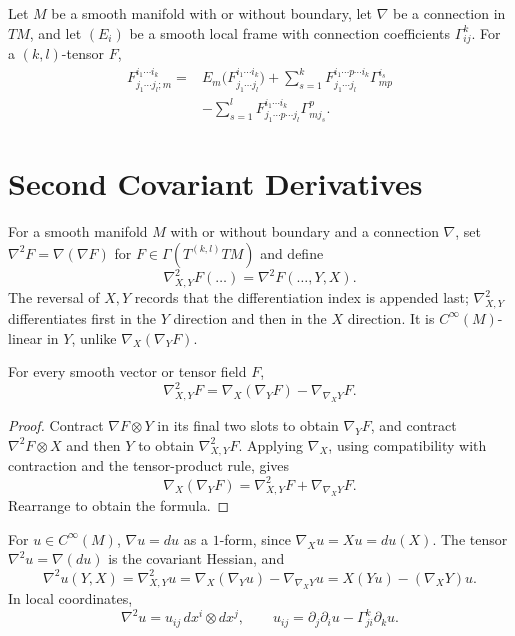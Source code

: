 \begin{proposition}
\label{prop:total-covariant-derivative-components}
Let $M$ be a smooth manifold with or without boundary, let $\nabla$ be a
connection in $TM$, and let $(E_i)$ be a smooth local frame with connection
coefficients $\Gamma^k_{ij}$. For a $(k,l)$-tensor $F$,
\[
\begin{aligned}
F^{i_1\cdots i_k}_{j_1\cdots j_l;m}
={}&E_m\bigl(F^{i_1\cdots i_k}_{j_1\cdots j_l}\bigr)
+\sum_{s=1}^kF^{i_1\cdots p\cdots i_k}_{j_1\cdots j_l}\Gamma^{i_s}_{mp}\\
&-\sum_{s=1}^lF^{i_1\cdots i_k}_{j_1\cdots p\cdots j_l}\Gamma^p_{mj_s}.
\end{aligned}
\]
\end{proposition}

\section{Second Covariant Derivatives}

For a smooth manifold $M$ with or without boundary and a connection $\nabla$,
set $\nabla^2F=\nabla(\nabla F)$ for $F\in\Gamma(T^{(k,l)}TM)$ and define
\[
\nabla^2_{X,Y}F(\ldots)=\nabla^2F(\ldots,Y,X).
\]
The reversal of $X,Y$ records that the differentiation index is appended last;
$\nabla^2_{X,Y}$ differentiates first in the $Y$ direction and then in the
$X$ direction. It is $C^\infty(M)$-linear in $Y$, unlike
$\nabla_X(\nabla_YF)$.

\begin{proposition}
\label{prop:second-covariant-derivative-formula}
\leanok
For every smooth vector or tensor field $F$,
\[
\nabla^2_{X,Y}F=\nabla_X(\nabla_YF)-\nabla_{\nabla_XY}F.
\]
\end{proposition}
\begin{proof}
\leanok
\sketch Contract $\nabla F\otimes Y$ in its final two slots to obtain
$\nabla_YF$, and contract $\nabla^2F\otimes X$ and then $Y$ to obtain
$\nabla^2_{X,Y}F$. Applying $\nabla_X$, using compatibility with contraction
and the tensor-product rule, gives
\[
\nabla_X(\nabla_YF)=\nabla^2_{X,Y}F+\nabla_{\nabla_XY}F.
\]
Rearrange to obtain the formula.
\end{proof}

\begin{example}
\label{ex:covariant-hessian}
\leanok
For $u\in C^\infty(M)$, $\nabla u=du$ as a $1$-form, since
$\nabla_Xu=Xu=du(X)$. The tensor $\nabla^2u=\nabla(du)$ is the covariant
Hessian, and
\[
\nabla^2u(Y,X)=\nabla^2_{X,Y}u
=\nabla_X(\nabla_Yu)-\nabla_{\nabla_XY}u
=X(Yu)-(\nabla_XY)u.
\]
In local coordinates,
\[
\nabla^2u=u_{ij}\,dx^i\otimes dx^j,
\qquad u_{ij}=\partial_j\partial_i u-\Gamma^k_{ji}\partial_ku.
\]
\end{example}

